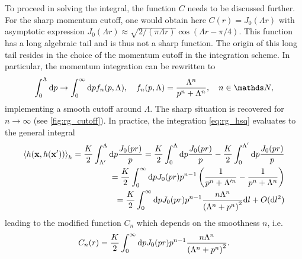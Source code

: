 To proceed in solving the integral, the function $C$ needs to be discussed further.
For the sharp momentum cutoff, one would obtain here $C(r) = J_0(\Lambda r)$ with asymptotic expression $J_0(\Lambda r)\approx\sqrt{2/(\pi \Lambda r)}\cos(\Lambda r-\pi/4)$.
This function has a long algebraic tail and is thus not a sharp function.
The origin of this long tail resides in the choice of the momentum cutoff in the integration scheme.
In particular, the momentum integration can be rewritten to
\begin{align}
    \int_{0}^{\Lambda}\rd p \rightarrow \int_{0}^\infty\rd p f_n(p,\Lambda),
    \quad
    f_n(p,\Lambda) = \frac{\Lambda^n}{p^n+\Lambda^n},
    \quad
    n\in\mathds N,
    \label{eq:integral_cutoff}
\end{align}
implementing a smooth cutoff around $\Lambda$.
The sharp situation is recovered for $n\rightarrow\infty$ (see \cref{fig:rg_cutoff}).
In practice, the integration \cref{eq:rg_hsq} evaluates to the general integral
\begin{align}
    \braket{h({\bf x},h(\bf x'))}_h = \frac K2\int_{\Lambda'}^\Lambda\mathrm d p\frac{J_0(p r)}{p} = \frac K2\int_{0}^\Lambda\mathrm d p\frac{J_0(p r)}{p}
    -\frac K2\int_{0}^{\Lambda'}\mathrm d p\frac{J_0(p r)}{p}
    \\
    =
    \frac K2\int_{0}^\infty\mathrm d p J_0(p r)p^{n-1}\left( \frac1{p^n+\Lambda'^n}-\frac1{p^n+\Lambda^n} \right)
    \\
    =
    \frac K2\int_{0}^\infty\mathrm d p J_0(p r)p^{n-1}\frac{n\Lambda^n}{\left(\Lambda^n+p^n\right)^2}\mathrm d l + O(\mathrm d l^2)
    \label{eq:rg_hxhxpr}
\end{align}
leading to the modified function $C_n$ which depends on the smoothness $n$, i.e.
\begin{align}
    C_n(r)
    =
    \frac K2\int_{0}^\infty\mathrm d p J_0(p r)p^{n-1}\frac{n\Lambda^n}{\left(\Lambda^n+p^n\right)^2}.
    \label{eq:rg_cn_def}
\end{align}
